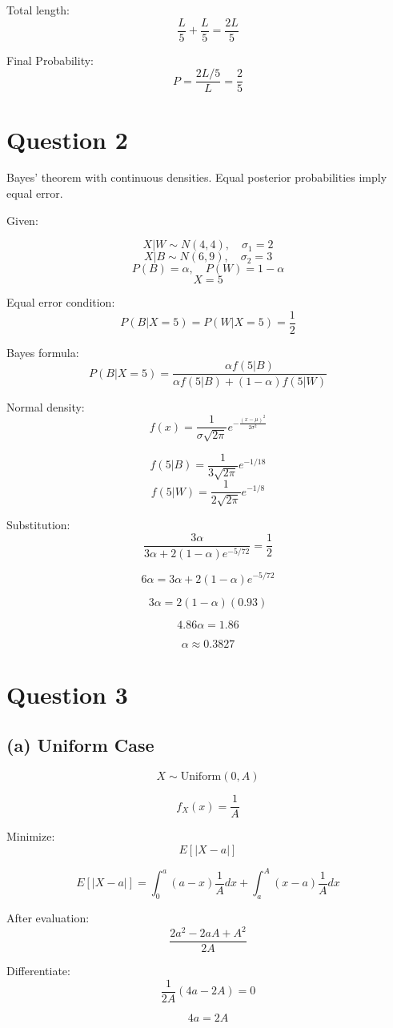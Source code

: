 \documentclass[12pt]{article}
\begin{document}
Total length:
\[
\frac{L}{5} + \frac{L}{5} = \frac{2L}{5}
\]

Final Probability:
\[
P = \frac{2L/5}{L} = \frac{2}{5}
\]

\section*{Question 2}
Bayes’ theorem with continuous densities.  
Equal posterior probabilities imply equal error.

Given:

\[
X|W \sim N(4,4), \quad \sigma_1 = 2
\]
\[
X|B \sim N(6,9), \quad \sigma_2 = 3
\]
\[
P(B)=\alpha, \quad P(W)=1-\alpha
\]
\[
X=5
\]

Equal error condition:
\[
P(B|X=5)=P(W|X=5)=\frac{1}{2}
\]

Bayes formula:
\[
P(B|X=5)=\frac{\alpha f(5|B)}{\alpha f(5|B)+(1-\alpha)f(5|W)}
\]

Normal density:
\[
f(x)=\frac{1}{\sigma\sqrt{2\pi}} e^{-\frac{(x-\mu)^2}{2\sigma^2}}
\]

\[
f(5|B)=\frac{1}{3\sqrt{2\pi}}e^{-1/18}
\]
\[
f(5|W)=\frac{1}{2\sqrt{2\pi}}e^{-1/8}
\]

Substitution:
\[
\frac{3\alpha}{3\alpha + 2(1-\alpha)e^{-5/72}}=\frac{1}{2}
\]

\[
6\alpha = 3\alpha + 2(1-\alpha)e^{-5/72}
\]

\[
3\alpha = 2(1-\alpha)(0.93)
\]

\[
4.86\alpha = 1.86
\]

\[
\alpha \approx 0.3827
\]

\section*{Question 3}

\subsection*{(a) Uniform Case}

\[
X \sim \text{Uniform}(0,A)
\]

\[
f_X(x)=\frac{1}{A}
\]

Minimize:
\[
E[|X-a|]
\]

\[
E[|X-a|]=\int_0^a (a-x)\frac{1}{A}dx + \int_a^A (x-a)\frac{1}{A}dx
\]

After evaluation:
\[
\frac{2a^2 - 2aA + A^2}{2A}
\]

Differentiate:
\[
\frac{1}{2A}(4a-2A)=0
\]

\[
4a=2A
\]
\end{document}
